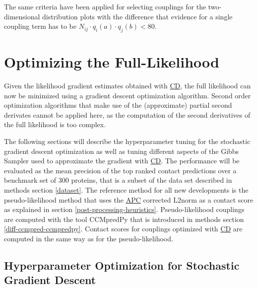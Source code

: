 \documentclass[12pt,a4paper,twoside]{book}
\theoremstyle{definition}
\theoremstyle{definition}
\theoremstyle{remark}
\begin{document}
The same criteria have been applied for selecting couplings for the
two-dimensional distribution plots with the difference that evidence for
a single coupling term has to be
\(N_{ij} \cdot q_i(a) \cdot q_j(b) < 80.\)

\section{Optimizing the
Full-Likelihood}\label{methods-optimizing-full-likelihood}

Given the likelihood gradient estimates obtained with
\protect\hyperlink{abbrev}{CD}, the full likelihood can now be minimized
using a gradient descent optimization algorithm. Second order
optimization algorithms that make use of the (approximate) partial
second derivates cannot be applied here, as the computation of the
second derivatives of the full likelihood is too complex.

The following sections will describe the hyperparameter tuning for the
stochastic gradient descent optimization as well as tuning different
aspects of the Gibbs Sampler used to approximate the gradient with
\protect\hyperlink{abbrev}{CD}. The performance will be evaluated as the
mean precision of the top ranked contact predictions over a benchmark
set of 300 proteins, that is a subset of the data set described in
methods section \ref{dataset}. The reference method for all new
developments is the pseudo-likelihood method that uses the
\protect\hyperlink{abbrev}{APC} corrected L2norm as a contact score as
explained in section \ref{post-processing-heuristics}. Pseudo-likelihood
couplings are computed with the tool CCMpredPy that is introduced in
methods section \ref{diff-ccmpred-ccmpredpy}. Contact scores for
couplings optimized with \protect\hyperlink{abbrev}{CD} are computed in
the same way as for the pseudo-likelihood.

\subsection{Hyperparameter Optimization for Stochastic Gradient
Descent}\label{hyperparameter-optimization-for-stochastic-gradient-descent}
\end{document}
